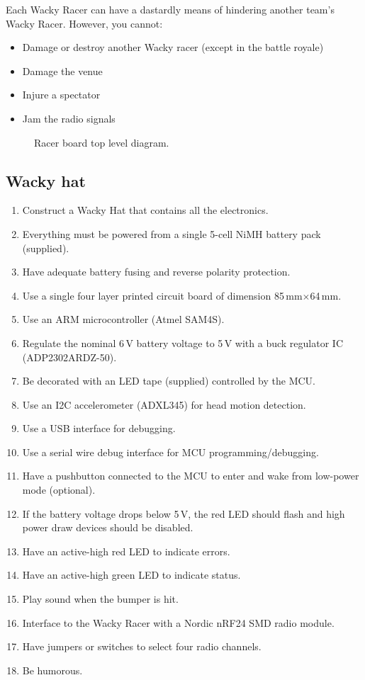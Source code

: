 \documentclass[11pt, a4paper]{article}
\begin{document}
Each Wacky Racer can have a dastardly means of hindering another
team's Wacky Racer.  However, you cannot:
%
\begin{itemize}
\item Damage or destroy another Wacky racer (except in the battle royale)
\item Damage the venue
\item Injure a spectator
\item Jam the radio signals
\end{itemize}


\vspace{1cm}

\begin{figure}[h]
    \centering
    
    \caption{Racer board top level diagram.}
\end{figure}


\vfill\pagebreak

\subsection{Wacky hat}


\begin{enumerate}
\item Construct a Wacky Hat that contains all the electronics.
\item Everything must be powered from a single 5-cell NiMH battery pack (supplied).
\item Have adequate battery fusing and reverse polarity protection.
\item Use a single four layer printed circuit board of dimension 85\,mm$\times$64\,mm.
\item Use an ARM microcontroller (Atmel SAM4S).
\item Regulate the nominal 6\,V battery voltage to 5\,V with a buck
  regulator IC (ADP2302ARDZ-50).
\item Be decorated with an LED tape (supplied) controlled by the MCU.
\item Use an I2C accelerometer (ADXL345) for head motion detection.
\item Use a USB interface for debugging.
\item Use a serial wire debug interface for MCU programming/debugging.
\item Have a pushbutton connected to the MCU to enter and wake from
  low-power mode (optional).
\item If the battery voltage drops below 5\,V, the red LED should flash and high power draw devices should be disabled.
\item Have an active-high red LED to indicate errors.
\item Have an active-high green LED to indicate status.
\item Play sound when the bumper is hit.
\item Interface to the Wacky Racer with a Nordic nRF24 SMD radio module.
\item Have jumpers or switches to select four radio channels.
\item Be humorous.
\end{enumerate}
\end{document}
